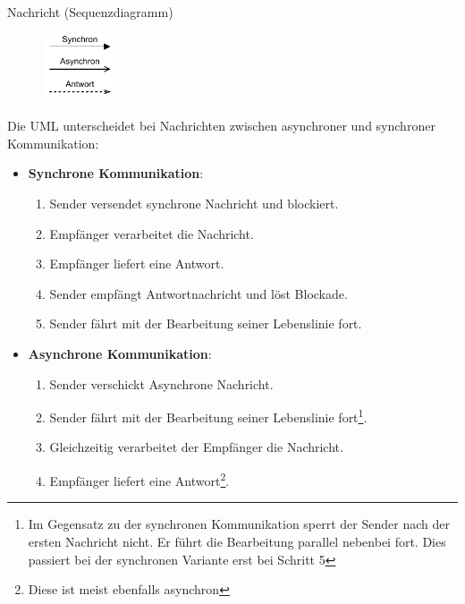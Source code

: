 \begin{defi}{Nachricht (Sequenzdiagramm)}
    \begin{figure}
        \centering
        \includegraphics[width=0.2\textwidth]{includes/figures/defi_diagrams_sequenz_message.pdf}
    \end{figure}
    Die UML unterscheidet bei Nachrichten zwischen asynchroner und synchroner Kommunikation:
    \begin{itemize}
        \item \textbf{Synchrone Kommunikation}:
              \begin{enumerate}
                  \item Sender versendet synchrone Nachricht und blockiert.
                  \item Empfänger verarbeitet die Nachricht.
                  \item Empfänger liefert eine Antwort.
                  \item Sender empfängt Antwortnachricht und löst Blockade.
                  \item Sender fährt mit der Bearbeitung seiner Lebenslinie fort.
              \end{enumerate}
        \item \textbf{Asynchrone Kommunikation}:
              \begin{enumerate}
                  \item Sender verschickt Asynchrone Nachricht.
                  \item Sender fährt mit der Bearbeitung seiner Lebenslinie fort\footnote{
                            Im Gegensatz zu der synchronen Kommunikation sperrt der Sender nach der ersten Nachricht nicht.
                            Er führt die Bearbeitung parallel nebenbei fort.
                            Dies passiert bei der synchronen Variante erst bei Schritt 5
                        }.
                  \item Gleichzeitig verarbeitet der Empfänger die Nachricht.
                  \item Empfänger liefert eine Antwort\footnote{Diese ist meist ebenfalls asynchron}.
              \end{enumerate}
    \end{itemize}


\end{defi}
